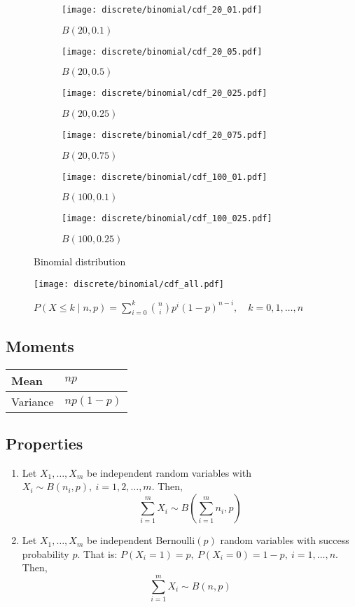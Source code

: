 \begin{figure}[H]
	\centering
	\begin{subfigure}[b]{0.45\textwidth}
		\texttt{[image: discrete/binomial/cdf\_20\_01.pdf]}
		\caption{$B(20, 0.1)$}
	\end{subfigure}
	\begin{subfigure}[b]{0.45\textwidth}
		\texttt{[image: discrete/binomial/cdf\_20\_05.pdf]}
		\caption{$B(20, 0.5)$}
	\end{subfigure}
	\begin{subfigure}[b]{0.45\textwidth}
		\texttt{[image: discrete/binomial/cdf\_20\_025.pdf]}
		\caption{$B(20, 0.25)$}
	\end{subfigure}
	\begin{subfigure}[b]{0.45\textwidth}
		\texttt{[image: discrete/binomial/cdf\_20\_075.pdf]}
		\caption{$B(20, 0.75)$}
	\end{subfigure}
	\begin{subfigure}[b]{0.45\textwidth}
		\texttt{[image: discrete/binomial/cdf\_100\_01.pdf]}
		\caption{$B(100, 0.1)$}
	\end{subfigure}
	\begin{subfigure}[b]{0.45\textwidth}
		\texttt{[image: discrete/binomial/cdf\_100\_025.pdf]}
		\caption{$B(100, 0.25)$}
	\end{subfigure}
	\caption{Binomial distribution}
\end{figure}

\begin{figure}[H]
	\texttt{[image: discrete/binomial/cdf\_all.pdf]}
	\caption{$P(X \leq k \mid n, p) = \sum_{i = 0}^{k} \binom{n}{i}p^{i}(1 - p)^{n - i}, \quad k = 0, 1, \ldots, n$}
\end{figure}

\subsection{Moments}

\begin{tabularx}{\textwidth}{s X}
	\hline
	Mean & $np$ \\\hline
	Variance & $np(1 - p)$\\\hline
\end{tabularx}

\subsection{Properties}
\begin{enumerate}
	\item Let $X_1, \ldots, X_m$ be independent random variables with $X_i \sim B(n_i, p), \ i = 1, 2, \ldots, m$. Then,
	\[
	\sum_{i = 1}^m X_i \sim B\left(\sum_{i = 1}^m n_i, p\right)
	\]
	\item Let $X_1, \ldots, X_m$ be independent Bernoulli$(p)$ random variables with success probability $p$. That is: $P(X_i = 1) = p, \ P(X_i = 0) = 1 - p, \ i = 1, \ldots, n$. Then,
	\[
	\sum_{i = 1}^m X_i \sim B\left(n, p\right)
	\]
\end{enumerate}

